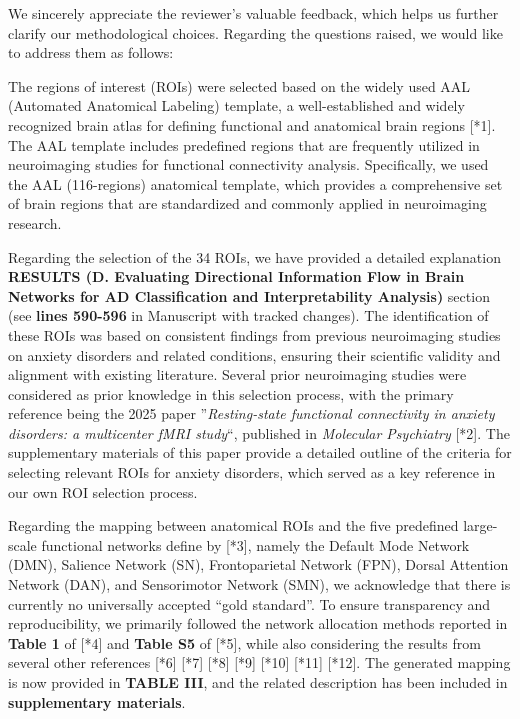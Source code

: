 \documentclass[12pt,technote,onecolumn]{IEEEtran}
\begin{document}
We sincerely appreciate the reviewer’s valuable feedback, which helps us further clarify our methodological choices. Regarding the questions raised, we would like to address them as follows:

The regions of interest (ROIs) were selected based on the widely used AAL (Automated Anatomical Labeling) template, a well-established and widely recognized brain atlas for defining functional and anatomical brain regions [*1]. The AAL template includes predefined regions that are frequently utilized in neuroimaging studies for functional connectivity analysis. Specifically, we used the AAL (116-regions) anatomical template, which provides a comprehensive set of brain regions that are standardized and commonly applied in neuroimaging research.

Regarding the selection of the 34 ROIs, we have provided a detailed explanation \textbf{RESULTS (D. Evaluating Directional Information Flow in Brain Networks for AD Classification and Interpretability Analysis)} section (see \textbf{lines 590-596} in Manuscript with tracked changes). The identification of these ROIs was based on consistent findings from previous neuroimaging studies on anxiety disorders and related conditions, ensuring their scientific validity and alignment with existing literature. Several prior neuroimaging studies were considered as prior knowledge in this selection process, with the primary reference being the 2025 paper ”\textit{Resting-state functional connectivity in anxiety disorders: a multicenter fMRI study}“, published in \textit{Molecular Psychiatry} [*2]. The supplementary materials of this paper provide a detailed outline of the criteria for selecting relevant ROIs for anxiety disorders, which served as a key reference in our own ROI selection process.

Regarding the mapping between anatomical ROIs and the five predefined large-scale functional networks define by [*3], namely the Default Mode Network (DMN), Salience Network (SN), Frontoparietal Network (FPN), Dorsal Attention Network (DAN), and Sensorimotor Network (SMN), we acknowledge that there is currently no universally accepted “gold standard”. To ensure transparency and reproducibility, we primarily followed the network allocation methods reported in \textbf{Table 1} of [*4] and \textbf{Table S5} of [*5], while also considering the results from several other references [*6] [*7] [*8] [*9] [*10] [*11] [*12]. The generated mapping is now provided in \textbf{TABLE III}, and the related description has been included in \textbf{supplementary materials}.
\end{document}
